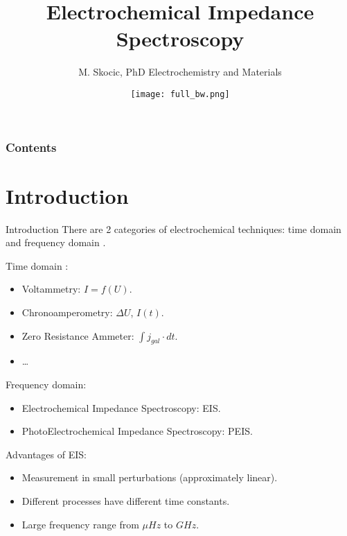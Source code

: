 \documentclass[10pt,compress,handout]{beamer}
\title{Electrochemical Impedance Spectroscopy}
\author{M. Skocic, PhD Electrochemistry and Materials}
\date{\vfill \texttt{[image: full\_bw.png]}}
\begin{document}
    \begin{frame}
        \titlepage
    \end{frame}

    \begin{frame}
        \frametitle{Contents}
        \tableofcontents
    \end{frame}
    
\section{Introduction}
    \begin{frame}{Introduction}
        There are 2 categories of electrochemical techniques: 
        time domain and frequency domain \citep{bard2001}.

        Time domain :
        \begin{itemize}
            \item Voltammetry: $I=f(U)$.
            \item Chronoamperometry: $\Delta U$, $I(t)$.
            \item Zero Resistance Ammeter: $\int j_{gal} \cdot dt$.
            \item \ldots
        \end{itemize}

        Frequency domain:
        \begin{itemize}
            \item Electrochemical Impedance Spectroscopy: EIS.
            \item PhotoElectrochemical Impedance Spectroscopy: PEIS.
        \end{itemize}

        Advantages of EIS:
        \begin{itemize}
            \item Measurement in small perturbations (approximately linear).
            \item Different processes have different time constants.
            \item Large frequency range from $\mu Hz$ to $GHz$.
        \end{itemize}
    \end{frame}
\end{document}
